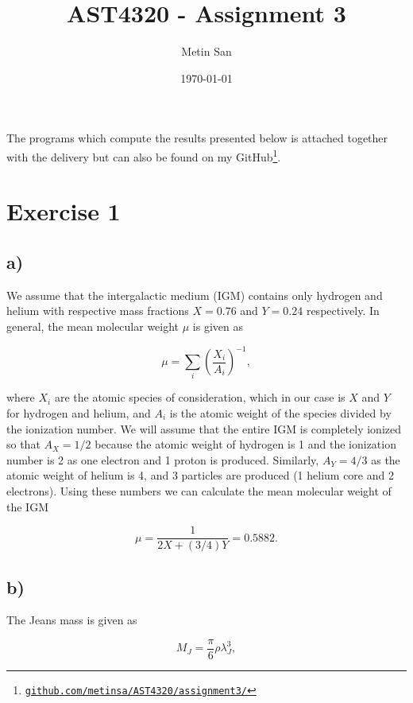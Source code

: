 \documentclass[a4paper]{article}
\title{AST4320 - Assignment 3}
\author{Metin San}
\date{\today}
\begin{document}
\maketitle

The programs which compute the results presented below is attached together with the delivery but can also be found on my
GitHub\footnote{\href{https://github.com/MetinSa/AST4320/blob/master/Assignment3
}{\texttt{github.com/metinsa/AST4320/assignment3/}}}. 

\section*{Exercise 1}
\subsection*{a)}
We assume that the intergalactic medium (IGM) contains only hydrogen and helium with
respective mass fractions $X = 0.76$ and $Y = 0.24$ respectively. In general, the mean
molecular weight $\mu$ is given as 

\begin{equation}\label{eq:mu}
    \mu = \sum_i \left ( \frac{X_i}{A_i} \right )^{-1},
\end{equation}

\noindent where $X_i$ are the atomic species of consideration, which in our case is $X$ and
$Y$ for hydrogen and helium, and $A_i$ is the atomic weight of the species divided by the
ionization number. We will assume that the entire IGM is completely ionized so that $A_X =
1/2$ because the atomic weight of hydrogen is 1 and the ionization number is 2 as one electron
and 1 proton is produced. Similarly, $A_Y = 4/3$ as the atomic weight of helium is 4, and 3
particles are produced (1 helium core and 2 electrons). Using these numbers we can calculate
the mean molecular weight of the IGM

\begin{equation}\label{eq:muIGM}
    \mu = \frac{1}{2X + (3/4)Y} = 0.5882.
\end{equation}

\subsection*{b)}
The Jeans mass is given as 

\begin{equation}\label{eq:jean}
    M_J = \frac{\pi}{6} \rho \lambda_J^3,
\end{equation}
\end{document}
